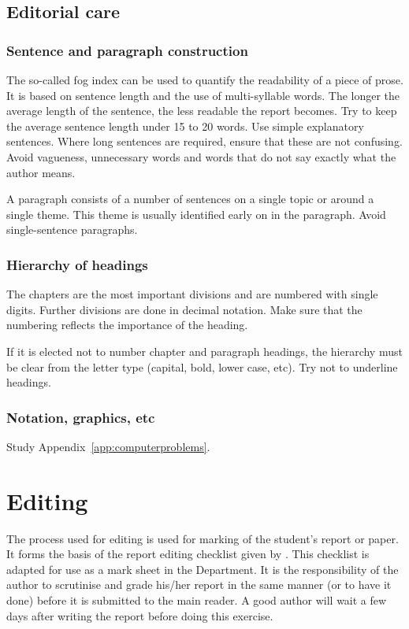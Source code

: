\documentclass[a5paper, 10pt]{article}
\begin{document}
\subsection{Editorial care}

\subsubsection{Sentence and paragraph construction}
The so-called fog index can be used to quantify the readability of a
piece of prose.  It is based on sentence length and the use of
multi-syllable words.  The longer the average length of the sentence,
the less readable the report becomes.  Try to keep the average
sentence length under 15 to 20 words.  Use simple explanatory
sentences.  Where long sentences are required, ensure that these are
not confusing.  Avoid vagueness, unnecessary words and words that do
not say exactly what the author means.

A paragraph consists of a number of sentences on a single topic or around a single theme.  
This theme is usually identified early on in the paragraph.
Avoid single-sentence paragraphs.

\subsubsection{Hierarchy of headings}
\label{sec:hierarchy-headings}
The chapters are the most important divisions and are numbered with
single digits.  Further divisions are done in decimal notation.  Make
sure that the numbering reflects the importance of the heading.

If it is elected not to number chapter and paragraph headings, the
hierarchy must be clear from the letter type (capital, bold, lower
case, etc).  Try not to underline headings.

\subsubsection{Notation, graphics, etc}
Study Appendix~\ref{app:computerproblems}.

\section{Editing}
\label{cha:editing}
The process used for editing is used for marking of the student's
report or paper.  It forms the basis of the report editing checklist
given by \citet[176]{bruckmanmandersloot}.  This checklist is adapted
for use as a mark sheet in the Department.  It is the responsibility
of the author to scrutinise and grade his/her report in the same
manner (or to have it done) before it is submitted to the main reader.
A good author will wait a few days after writing the report before
doing this exercise.
\end{document}
